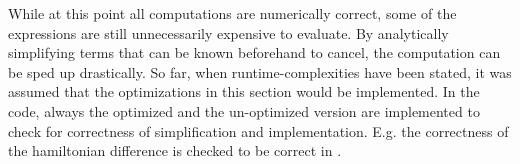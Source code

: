 While at this point all computations are numerically correct, some of the expressions are still unnecessarily expensive to evaluate.
By analytically simplifying terms that can be known beforehand to cancel, the computation can be sped up drastically.
So far, when runtime-complexities have been stated, it was assumed that the optimizations in this section would be implemented.
In the code, always the optimized and the un-optimized version are implemented to check for correctness of simplification and implementation.
E.g. the correctness of the hamiltonian difference is checked to be correct in .